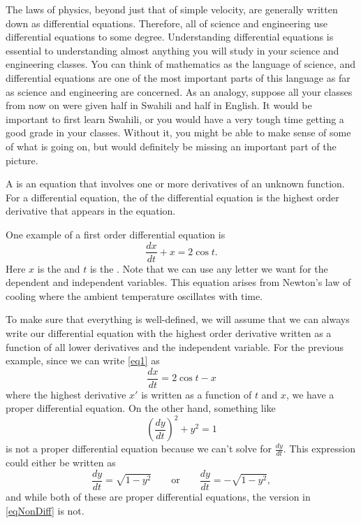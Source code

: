 The laws of physics, beyond just that of simple velocity, are generally written down as differential
equations.  Therefore, all of science and engineering use
differential equations to some degree.  Understanding
differential equations is essential to understanding almost anything you will
study in your science and engineering classes.
You can think of mathematics as the language of science, and
differential equations are one of the most important parts of this
language as far as science and engineering are concerned.  As an analogy,
suppose all your classes from now on were given half in Swahili and half in English.  
It would be important to first learn Swahili, or you would have a very
tough time getting a good grade in your classes. Without it, you might be able to make sense of some of what is going on, but would definitely be missing an important part of the picture. 


\begin{definition}
A \emph{} is an equation that involves one or more derivatives of an unknown function. For a differential equation, the \emph{} of the differential equation is the highest order derivative that appears in the equation. 
\end{definition}

One example of a first order differential equation is
\begin{equation} \label{eq1}
\frac{dx}{dt} + x = 2 \cos t .
\end{equation}
Here $x$ is the \emph{} and $t$ is the
\emph{}. Note that we can use any letter we want for the dependent and independent variables. This equation arises from Newton's law of cooling where the ambient
temperature oscillates with time. 

To make sure that everything is well-defined, we will assume that we can always write our differential equation with the highest order derivative written as a function of all lower derivatives and the independent variable. For the previous example, since we can write \eqref{eq1} as
\[ \frac{dx}{dt} = 2\cos t - x \] where the highest derivative $x'$ is written as a function of $t$ and $x$, we have a proper differential equation. On the other hand, something like
\begin{equation}
\left(\frac{dy}{dt}\right)^2 + y^2 = 1 \label{eqNonDiff}
\end{equation}
 is not a proper differential equation because we can't solve for $\frac{dy}{dt}$. This expression could either be written as
\[ \frac{dy}{dt} = \sqrt{1 - y^2} \qquad \text{or} \qquad \frac{dy}{dt} = -\sqrt{1 - y^2}, \] and while both of these are proper differential equations, the version in \eqref{eqNonDiff} is not.   


